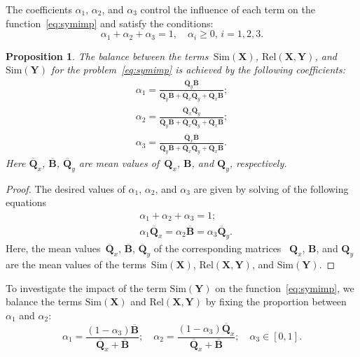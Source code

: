 \documentclass[12pt,oneside]{article}
\newtheorem{proposition}{Proposition}
\theoremstyle{definition}
\newcommand{\bY}{\mathbf{Y}}
\newcommand{\bX}{\mathbf{X}}
\newcommand{\bB}{\mathbf{B}}
\newcommand{\bQ}{\mathbf{Q}}
\begin{document}
The coefficients $\alpha_1$, $\alpha_2$, and $\alpha_3$ control the influence of each term on the function~\eqref{eq:symimp} and satisfy the conditions:
\begin{equation}
\alpha_1 + \alpha_2 + \alpha_3 = 1, \quad \alpha_i \geq 0, \, i = 1, 2, 3.
\end{equation}
\begin{proposition}
	The balance between the terms~$\text{Sim}(\bX)$, $\text{Rel}(\bX, \bY)$, and $\text{Sim}(\bY)$ for the problem~\eqref{eq:symimp} is achieved by the following coefficients:
	\begin{align}
	\alpha_1 = \frac{\overline{\bQ}_y \overline{\bB} }{\overline{\bQ}_y \overline{\bB} + \overline{\bQ}_x \overline{\bQ}_y + \overline{\bQ}_x \overline{\bB}}; \\
	\alpha_2 = \frac{\overline{\bQ}_x \overline{\bQ}_y}{\overline{\bQ}_y \overline{\bB} + \overline{\bQ}_x \overline{\bQ}_y + \overline{\bQ}_x \overline{\bB}}; \\
	\alpha_3  = \frac{\overline{\bQ}_x \overline{\bB}}{\overline{\bQ}_y \overline{\bB} + \overline{\bQ}_x \overline{\bQ}_y + \overline{\bQ}_x \overline{\bB}}.
	\label{eq:alpha_3}
	\end{align}
	Here $\overline{\bQ}_x$, $\overline{\bB}$, $\overline{\bQ}_y$ are mean values of~$\bQ_x$, $\bB$, and $\bQ_y$, respectively.

\end{proposition}
\begin{proof}
	The desired values of $\alpha_1$, $\alpha_2$, and $\alpha_3$ are given by solving of the following equations
	\begin{align}
		&\alpha_1 + \alpha_2 + \alpha_3 = 1; \\
		&\alpha_1 \overline{\bQ}_x = \alpha_2 \overline{\bB} = \alpha_3 \overline{\bQ}_y.
	\end{align}
	Here, the mean values~$\overline{\bQ}_x$, $\overline{\bB}$, $\overline{\bQ}_y$ of the corresponding matrices ~$\bQ_x$, $\bB$, and $\bQ_y$ are the mean values of the terms~$\text{Sim}(\bX)$, $\text{Rel}(\bX, \bY)$, and $\text{Sim}(\bY)$.
\end{proof}
To investigate the impact of the term $\text{Sim}(\bY)$ on the function~\eqref{eq:symimp}, we balance the terms $\text{Sim}(\bX)$ and $\text{Rel}(\bX, \bY)$ by fixing the proportion between~$\alpha_1$ and $\alpha_2$:
\begin{equation}
\alpha_1 = \frac{(1 - \alpha_3)\overline{\bB}}{\overline{\bQ}_x + \overline{\bB}}; \quad
\alpha_2 = \frac{(1 - \alpha_3)\overline{\bQ}_x}{\overline{\bQ}_x + \overline{\bB}}; \quad
\alpha_3 \in [0, 1].
\label{eq:alphas3}
\end{equation}
\end{document}
